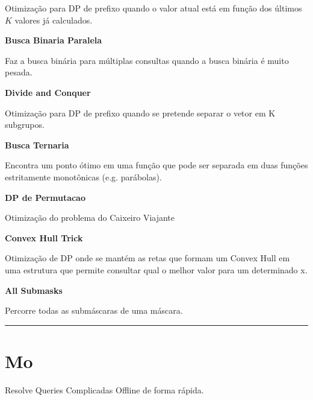 \documentclass[11pt, a4paper, twoside]{book}
\begin{document}
Otimização para DP de prefixo quando o valor atual está em função dos últimos $K$ valores já calculados.   





\textbf{Busca Binaria Paralela} 



Faz a busca binária para múltiplas consultas quando a busca binária é muito pesada.





\textbf{Divide and Conquer} 



Otimização para DP de prefixo quando se pretende separar o vetor em K subgrupos.    





\textbf{Busca Ternaria} 



Encontra um ponto ótimo em uma função que pode ser separada em duas funções estritamente monotônicas (e.g. parábolas).





\textbf{DP de Permutacao} 



Otimização do problema do Caixeiro Viajante





\textbf{Convex Hull Trick} 



Otimização de DP onde se mantém as retas que formam um Convex Hull em uma estrutura que permite consultar qual o melhor valor para um determinado x.





\textbf{All Submasks} 



Percorre todas as submáscaras de uma máscara.






\hfill

\rule{\textwidth}{0.4pt}

\section{Mo}



Resolve Queries Complicadas Offline de forma rápida.  
\end{document}
